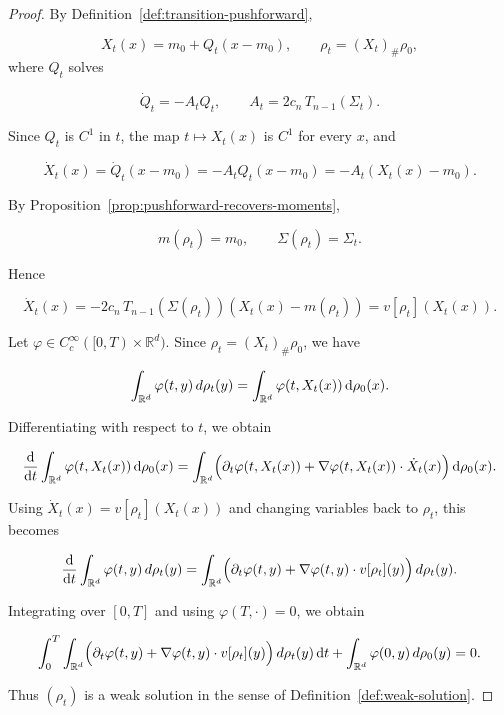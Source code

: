 \documentclass[11pt,reqno]{amsart}
\numberwithin{figure}{section}
\def\d {{\partial}}
\def\d{\mathrm{d}}
\renewcommand{\d}{  {\textup{d}} }
\begin{document}
\begin{proof} 

By Definition~\ref{def:transition-pushforward}, 

\[ X_t(x)=m_0+Q_t(x-m_0), \qquad \rho_t=(X_t)_\#\rho_0, \] 
where $Q_t$ solves 

\[ \dot Q_t=-A_tQ_t, \qquad A_t=2c_n\,T_{n-1}(\Sigma_t). \] 

Since $Q_t$ is $C^1$ in $t$, the map $t\mapsto X_t(x)$ is $C^1$ for every $x$, and 

\[ \dot X_t(x)=\dot Q_t(x-m_0)=-A_tQ_t(x-m_0)=-A_t(X_t(x)-m_0). \] 

By Proposition~\ref{prop:pushforward-recovers-moments}, 

\[ m(\rho_t)=m_0, \qquad \Sigma(\rho_t)=\Sigma_t. \] 

Hence 

\[ \dot X_t(x) = -2c_n\,T_{n-1}(\Sigma(\rho_t))(X_t(x)-m(\rho_t)) = v[\rho_t](X_t(x)). \]

Let $\varphi\in C_c^\infty([0,T)\times\mathbb R^d)$. Since $\rho_t=(X_t)_\#\rho_0$, we have

\[ \int_{\mathbb R^d}\varphi(t,y)\,d\rho_t(y) = \int_{\mathbb R^d}\varphi(t,X_t(x))\,\d\rho_0(x). \] 

Differentiating with respect to $t$, we obtain 

\[ \frac{\d}{\d t}\int_{\mathbb R^d}\varphi(t,X_t(x))\,\d\rho_0(x) = \int_{\mathbb R^d} \Bigl(\partial_t\varphi(t,X_t(x)) +\nabla\varphi(t,X_t(x))\cdot \dot X_t(x)\Bigr)\,\d\rho_0(x). \]

Using $\dot X_t(x)=v[\rho_t](X_t(x))$ and changing variables back to $\rho_t$, this becomes 

\[ \frac{\d}{\d t}\int_{\mathbb R^d}\varphi(t,y)\,d\rho_t(y) = \int_{\mathbb R^d} \Bigl(\partial_t\varphi(t,y)+\nabla\varphi(t,y)\cdot v[\rho_t](y)\Bigr)\,d\rho_t(y). \] 

Integrating over $[0,T]$ and using $\varphi(T,\cdot)=0$, we obtain 

\[ \int_0^T\int_{\mathbb R^d} \Bigl(\partial_t\varphi(t,y)+\nabla\varphi(t,y)\cdot v[\rho_t](y)\Bigr)\,d\rho_t(y)\,\d t + \int_{\mathbb R^d}\varphi(0,y)\,d\rho_0(y) =0. \] 

Thus $(\rho_t)$ is a weak solution in the sense of Definition~\ref{def:weak-solution}. \end{proof} 
\end{document}

